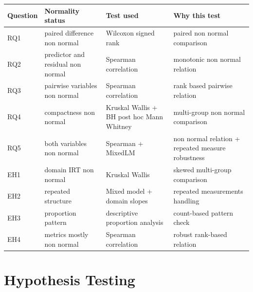 {\def\LTcaptype{none} %
\begin{longtable}[]{@{}
  >{\raggedright\arraybackslash}p{}
  >{\raggedright\arraybackslash}p{}
  >{\raggedright\arraybackslash}p{}
  >{\raggedright\arraybackslash}p{}@{}}
\toprule\noalign{}
\begin{minipage}[b]{\linewidth}\raggedright
Question
\end{minipage} & \begin{minipage}[b]{\linewidth}\raggedright
Normality status
\end{minipage} & \begin{minipage}[b]{\linewidth}\raggedright
Test used
\end{minipage} & \begin{minipage}[b]{\linewidth}\raggedright
Why this test
\end{minipage} \\
\midrule\noalign{}
\endhead
\bottomrule\noalign{}
\endlastfoot
RQ1 & paired difference non normal & Wilcoxon signed rank & paired non
normal comparison \\
RQ2 & predictor and residual non normal & Spearman correlation &
monotonic non normal relation \\
RQ3 & pairwise variables non normal & Spearman correlation & rank based
pairwise relation \\
RQ4 & compactness non normal & Kruskal Wallis + BH post hoc Mann Whitney
& multi-group non normal comparison \\
RQ5 & both variables non normal & Spearman + MixedLM & non normal
relation + repeated measure robustness \\
EH1 & domain IRT non normal & Kruskal Wallis & skewed multi-group
comparison \\
EH2 & repeated structure & Mixed model + domain slopes & repeated
measurements handling \\
EH3 & proportion pattern & descriptive proportion analysis & count-based
pattern check \\
EH4 & metrics mostly non normal & Spearman correlation & robust
rank-based relation \\
\end{longtable}
}

\section{Hypothesis Testing}\label{hypothesis-testing}

